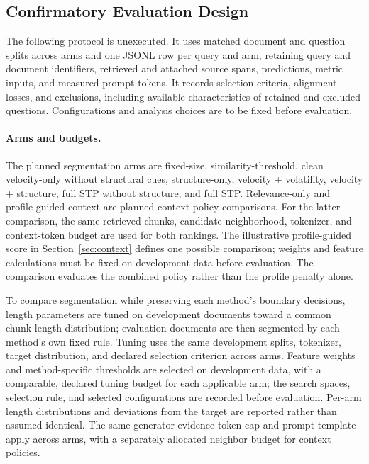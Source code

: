 \documentclass[10pt]{article}
\begin{document}
\subsection{Confirmatory Evaluation Design}
\label{sec:protocol}

The following protocol is unexecuted. It uses matched document and question splits across arms and one JSONL row per query and arm, retaining query and document identifiers, retrieved and attached source spans, predictions, metric inputs, and measured prompt tokens. It records selection criteria, alignment losses, and exclusions, including available characteristics of retained and excluded questions. Configurations and analysis choices are to be fixed before evaluation.

\paragraph{Arms and budgets.}
The planned segmentation arms are fixed-size, similarity-threshold, clean velocity-only without structural cues, structure-only, velocity + volatility, velocity + structure, full STP without structure, and full STP. Relevance-only and profile-guided context are planned context-policy comparisons. For the latter comparison, the same retrieved chunks, candidate neighborhood, tokenizer, and context-token budget are used for both rankings. The illustrative profile-guided score in Section~\ref{sec:context} defines one possible comparison; weights and feature calculations must be fixed on development data before evaluation. The comparison evaluates the combined policy rather than the profile penalty alone.

To compare segmentation while preserving each method's boundary decisions, length parameters are tuned on development documents toward a common chunk-length distribution; evaluation documents are then segmented by each method's own fixed rule. Tuning uses the same development splits, tokenizer, target distribution, and declared selection criterion across arms. Feature weights and method-specific thresholds are selected on development data, with a comparable, declared tuning budget for each applicable arm; the search spaces, selection rule, and selected configurations are recorded before evaluation. Per-arm length distributions and deviations from the target are reported rather than assumed identical. The same generator evidence-token cap and prompt template apply across arms, with a separately allocated neighbor budget for context policies.
\end{document}
